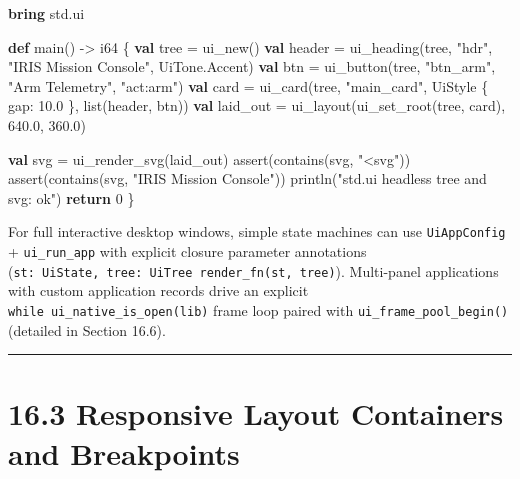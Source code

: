 \documentclass[
  english,
  oneside]{book}
\newenvironment{Shaded}{\begin{snugshade}}{\end{snugshade}}
\newcommand{\ControlFlowTok}[1]{\textcolor[rgb]{0.77,0.53,0.75}{\textbf{#1}}}
\newcommand{\DataTypeTok}[1]{\textcolor[rgb]{0.31,0.79,0.69}{#1}}
\newcommand{\DecValTok}[1]{\textcolor[rgb]{0.71,0.81,0.66}{#1}}
\newcommand{\FloatTok}[1]{\textcolor[rgb]{0.71,0.81,0.66}{#1}}
\newcommand{\FunctionTok}[1]{\textcolor[rgb]{0.86,0.86,0.67}{#1}}
\newcommand{\KeywordTok}[1]{\textcolor[rgb]{0.34,0.61,0.84}{\textbf{#1}}}
\newcommand{\NormalTok}[1]{\textcolor[rgb]{0.83,0.83,0.83}{#1}}
\newcommand{\OperatorTok}[1]{\textcolor[rgb]{0.83,0.83,0.83}{#1}}
\newcommand{\StringTok}[1]{\textcolor[rgb]{0.81,0.57,0.47}{#1}}
\begin{document}
\begin{Shaded}
\begin{Highlighting}[]
\KeywordTok{bring}\NormalTok{ std}\OperatorTok{.}\NormalTok{ui}

\KeywordTok{def}\NormalTok{ main() }\OperatorTok{{-}\textgreater{}} \DataTypeTok{i64}\NormalTok{ \{}
    \KeywordTok{val}\NormalTok{ tree }\OperatorTok{=}\NormalTok{ ui\_new()}
    \KeywordTok{val}\NormalTok{ header }\OperatorTok{=}\NormalTok{ ui\_heading(tree, }\StringTok{"hdr"}\NormalTok{, }\StringTok{"IRIS Mission Console"}\NormalTok{, UiTone}\OperatorTok{.}\NormalTok{Accent)}
    \KeywordTok{val}\NormalTok{ btn }\OperatorTok{=}\NormalTok{ ui\_button(tree, }\StringTok{"btn\_arm"}\NormalTok{, }\StringTok{"Arm Telemetry"}\NormalTok{, }\StringTok{"act:arm"}\NormalTok{)}
    \KeywordTok{val}\NormalTok{ card }\OperatorTok{=}\NormalTok{ ui\_card(tree, }\StringTok{"main\_card"}\NormalTok{, UiStyle \{ gap: }\FloatTok{10.0}\NormalTok{ \}, }\DataTypeTok{list}\NormalTok{(header, btn))}
    \KeywordTok{val}\NormalTok{ laid\_out }\OperatorTok{=}\NormalTok{ ui\_layout(ui\_set\_root(tree, card), }\FloatTok{640.0}\NormalTok{, }\FloatTok{360.0}\NormalTok{)}

    \KeywordTok{val}\NormalTok{ svg }\OperatorTok{=}\NormalTok{ ui\_render\_svg(laid\_out)}
    \FunctionTok{assert}\NormalTok{(}\FunctionTok{contains}\NormalTok{(svg, }\StringTok{"\textless{}svg"}\NormalTok{))}
    \FunctionTok{assert}\NormalTok{(}\FunctionTok{contains}\NormalTok{(svg, }\StringTok{"IRIS Mission Console"}\NormalTok{))}
\NormalTok{    println(}\StringTok{"std.ui headless tree and svg: ok"}\NormalTok{)}
    \ControlFlowTok{return} \DecValTok{0}
\NormalTok{\}}
\end{Highlighting}
\end{Shaded}

For full interactive desktop windows, simple state machines can use
\texttt{UiAppConfig} + \texttt{ui\_run\_app} with explicit closure
parameter annotations
(\texttt{\textbar{}st:\ UiState,\ tree:\ UiTree\textbar{}\ render\_fn(st,\ tree)}).
Multi-panel applications with custom application records drive an
explicit \texttt{while\ ui\_native\_is\_open(lib)} frame loop paired
with \texttt{ui\_frame\_pool\_begin()} (detailed in Section 16.6).

\begin{center}\rule{0.5\linewidth}{0.5pt}\end{center}

\section{16.3 Responsive Layout Containers and
Breakpoints}\label{responsive-layout-containers-and-breakpoints}
\end{document}
